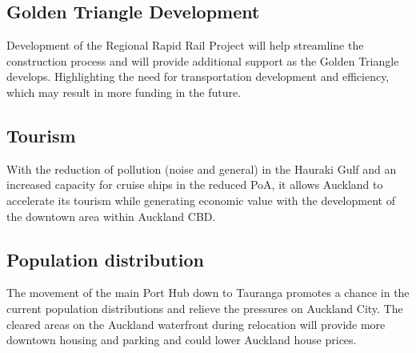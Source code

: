 \newpage
{}
\vspace*{-40mm} %
\vspace{-2mm}

\subsection*{Golden Triangle Development}

Development of the Regional Rapid Rail Project will help streamline the construction process and will provide additional support as the Golden Triangle develops. Highlighting the need for transportation development and efficiency, which may result in more funding in the future. 
\subsection*{Tourism}

With the reduction of pollution (noise and general) in the Hauraki Gulf and an increased capacity for cruise ships in the reduced PoA, it allows Auckland to accelerate its tourism while generating economic value with the development of the downtown area within Auckland CBD.
 
\subsection*{Population distribution}
The movement of the main Port Hub down to Tauranga promotes a chance in the current population distributions and relieve the pressures on Auckland City. The cleared areas on the Auckland waterfront during relocation will provide more downtown housing and parking and could lower Auckland house prices.  

